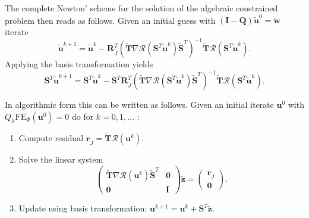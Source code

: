 The complete Newton' scheme for the solution of the algebraic
constrained problem then reads as follows. Given an initial guess with
$(\mathbf{I}-\mathbf{Q})\tilde{\mathbf{u}}^0 = \tilde{\mathbf{w}}$ iterate
\begin{equation*}
\tilde{\mathbf{u}}^{k+1} = \tilde{\mathbf{u}}^{k} - 
\mathbf{R}_{\tilde{J}}^T \left (\tilde{\mathbf{T}}
 \nabla\mathcal{R}(\mathbf{S}^T\tilde{\mathbf{u}}^k)
 \tilde{\mathbf{S}}^T \right)^{-1}
 \tilde{\mathbf{T}}\mathcal{R}(\mathbf{S}^T\tilde{\mathbf{u}}^k) .
\end{equation*}
Applying the basis transformation yields
\begin{equation*}
\mathbf{S}^T\tilde{\mathbf{u}}^{k+1} = \mathbf{S}^T\tilde{\mathbf{u}}^{k} - 
\mathbf{S}^T\mathbf{R}_{\tilde{J}}^T \left (\tilde{\mathbf{T}}
 \nabla\mathcal{R}(\mathbf{S}^T\tilde{\mathbf{u}}^k)
 \tilde{\mathbf{S}}^T \right)^{-1}
 \tilde{\mathbf{T}}\mathcal{R}(\mathbf{S}^T\tilde{\mathbf{u}}^k) .
\end{equation*}

In algorithmic form this can be written as follows. Given an initial
iterate $\mathbf{u}^0$ with $Q_h \text{FE}_{\Phi}(\mathbf{u}^0) = 0$
do for $k=0,1,\ldots$ :
\begin{enumerate}[1)]
\item Compute residual $\mathbf{r}_{\tilde{J}} =
  \tilde{\mathbf{T}}\mathcal{R}(\mathbf{u}^k)$. 
\item Solve the linear system 
\begin{equation*}
\left(\begin{array}{cc}
\tilde{\mathbf{T}}
 \nabla\mathcal{R}(\mathbf{u}^k)
 \tilde{\mathbf{S}}^T & \mathbf{0}\\
\mathbf{0} & \mathbf{I}
\end{array}\right)
\tilde{\mathbf{z}} = \left(\begin{array}{cc}
\mathbf{r}_{\tilde{J}}\\
\mathbf{0}
\end{array}\right) .
\end{equation*}
\item Update using basis transformation: $\mathbf{u}^{k+1} =
  \mathbf{u}^{k} + \mathbf{S}^T \tilde{\mathbf{z}}$.
\end{enumerate}
